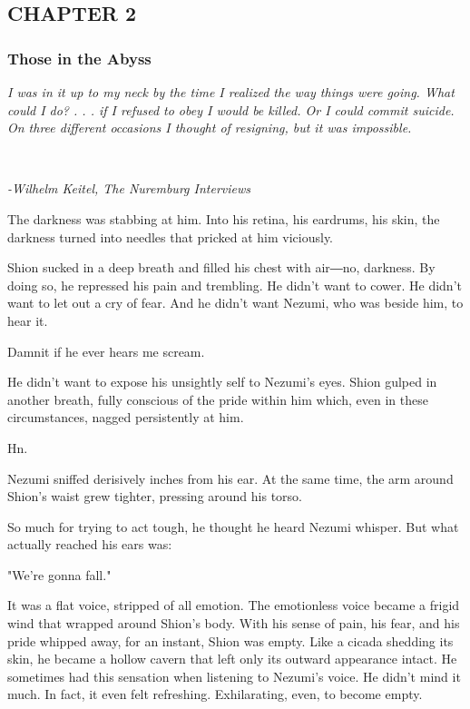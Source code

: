 \protect\hypertarget{index_split_029.html}{}{}

\hypertarget{index_split_029.htmlux5cux23calibre_pb_0}{}

\hypertarget{index_split_029.htmlux5cux23calibre_toc_3}{%
\subsection{CHAPTER 2}\label{index_split_029.htmlux5cux23calibre_toc_3}}

\subsubsection{Those in the Abyss}

\emph{I was in it up to my neck by the time I realized the way things
were going. What could I do? . . . if I refused to obey I would be
killed. Or I could commit suicide. On three different occasions I
thought of resigning, but it was impossible.}

\emph{\\
}

\emph{-Wilhelm Keitel, The Nuremburg Interviews}

The darkness was stabbing at him. Into his retina, his eardrums, his
skin, the darkness turned into needles that pricked at him viciously.

Shion sucked in a deep breath and filled his chest with air―no,
darkness. By doing so, he repressed his pain and trembling. He didn't
want to cower. He didn't want to let out a cry of fear. And he didn't
want Nezumi, who was beside him, to hear it.

Damnit if he ever hears me scream.

He didn't want to expose his unsightly self to Nezumi's eyes. Shion
gulped in another breath, fully conscious of the pride within him which,
even in these circumstances, nagged persistently at him.

Hn.

Nezumi sniffed derisively inches from his ear. At the same time, the arm
around Shion's waist grew tighter, pressing around his torso.

So much for trying to act tough, he thought he heard Nezumi whisper. But
what actually reached his ears was:

"We're gonna fall."

It was a flat voice, stripped of all emotion. The emotionless voice
became a frigid wind that wrapped around Shion's body. With his sense of
pain, his fear, and his pride whipped away, for an instant, Shion was
empty. Like a cicada shedding its skin, he became a hollow cavern that
left only its outward appearance intact. He sometimes had this sensation
when listening to Nezumi's voice. He didn't mind it much. In fact, it
even felt refreshing. Exhilarating, even, to become empty.

